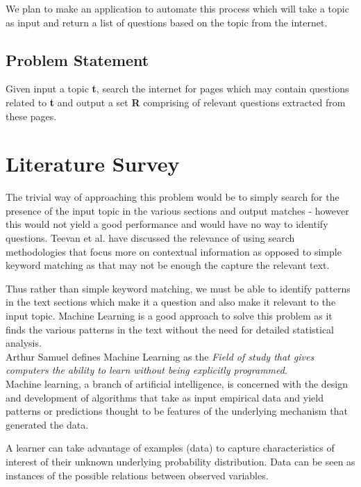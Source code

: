 \documentclass[10pt,a4paper]{report}
\begin{document}
We plan to make an application to automate this process which will take a topic as input and return a list of questions based on the topic from the internet.

\section{Problem Statement}

Given input a topic \textbf{t}, search the internet for pages which may contain questions related to \textbf{t} and output a set \textbf{R} comprising of relevant questions extracted from these pages.


\chapter{Literature Survey}

The trivial way of approaching this problem would be to simply search for the presence of the input topic in the various sections and output matches - however this would not yield a good performance and would have no way to identify questions. Teevan et al.\cite{teevan} have discussed the relevance of using search methodologies that focus more on contextual information as opposed to simple keyword matching as that may not be enough the capture the relevant text. 

Thus rather than simple keyword matching, we must be able to identify patterns in the text sections which make it a question and also make it relevant to the input topic. Machine Learning is a good approach to solve this problem as it finds the various patterns in the text without the need for detailed statistical analysis. \\

Arthur Samuel defines Machine Learning as the \textit{Field of study that gives computers the ability to learn without being explicitly programmed}. \\

Machine learning, a branch of artificial intelligence, is concerned with the design and development of algorithms that take as input empirical data and yield patterns or predictions thought to be features of the underlying mechanism that generated the data.

A learner can take advantage of examples (data) to capture characteristics of interest of their unknown underlying probability distribution. Data can be seen as instances of the possible relations between observed variables.
\end{document}
